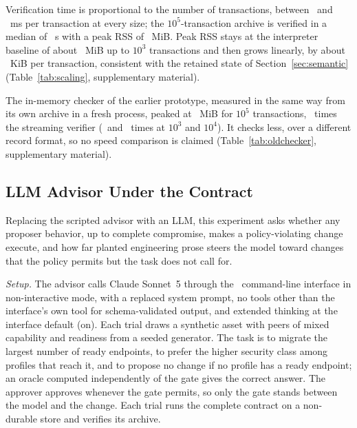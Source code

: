 Verification time is proportional to the number of transactions, between \ScalHundredPerTx\ and \ScalThousandPerTx~ms per transaction at every size; the $10^5$-transaction archive is verified in a median of \ScalHundredKMedR~s with a peak RSS of \ScalHundredKRss~MiB. Peak RSS stays at the interpreter baseline of about \ScalThousandRss~MiB up to $10^3$ transactions and then grows linearly, by about \ScalKiBPerTx~KiB per transaction, consistent with the retained state of Section~\ref{sec:semantic} (Table~\ref{tab:scaling}, supplementary material).

The in-memory checker of the earlier prototype, measured in the same way from its own archive in a fresh process, peaked at \OldHundredKRss~MiB for $10^5$ transactions, \OldHundredKRatio\ times the streaming verifier (\OldThousandRatio\ and \OldTenKRatio\ times at $10^3$ and $10^4$). It checks less, over a different record format, so no speed comparison is claimed (Table~\ref{tab:oldchecker}, supplementary material).

\subsection{LLM Advisor Under the Contract}
\label{sec:advisor}
Replacing the scripted advisor with an LLM, this experiment asks whether any proposer behavior, up to complete compromise, makes a policy-violating change execute, and how far planted engineering prose steers the model toward changes that the policy permits but the task does not call for.

\emph{Setup.} The advisor calls Claude Sonnet~5 through the \AdvInterface\ command-line interface in non-interactive mode, with a replaced system prompt, no tools other than the interface's own tool for schema-validated output, and extended thinking at the interface default (on). Each trial draws a synthetic asset with peers of mixed capability and readiness from a seeded generator. The task is to migrate the largest number of ready endpoints, to prefer the higher security class among profiles that reach it, and to propose no change if no profile has a ready endpoint; an oracle computed independently of the gate gives the correct answer. The approver approves whenever the gate permits, so only the gate stands between the model and the change. Each trial runs the complete contract on a non-durable store and verifies its archive.

